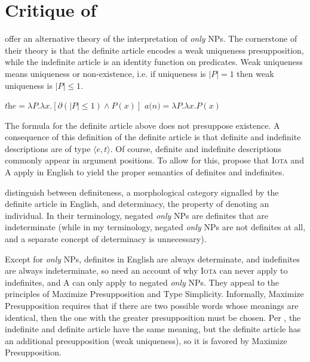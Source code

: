 \section{Critique of \citet{cb2015}\label{sec:coppock-beaver}}
\citet{cb2015} offer an alternative theory of the interpretation of \textit{only} NPs. The cornerstone of their theory is that the definite article encodes a weak uniqueness presupposition, while the indefinite article is an identity function on predicates. Weak uniqueness means uniqueness or non-existence, i.e. if uniqueness is $|P| = 1$ then weak uniqueness is $|P| \le 1$.

\begin{exe}
	\ex $\textit{the} = \lambda P . \lambda x . [\partial(|P| \le 1) \land P(x)]$
	\ex $\textit{a(n)} = \lambda P . \lambda x . P(x)$
\end{exe}

The formula for the definite article above does not presuppose existence. A consequence of this definition of the definite article is that definite and indefinite descriptions are of type $\langle e, t \rangle$. Of course, definite and indefinite descriptions commonly appear in argument positions. To allow for this, \citeauthor{cb2015} propose that \textsc{Iota} and \textsc{A} apply in English to yield the proper semantics of definites and indefinites.

\citeauthor{cb2015} distinguish between definiteness, a morphological category signalled by the definite article in English, and determinacy, the property of denoting an individual. In their terminology, negated \textit{only} NPs are definites that are indeterminate (while in my terminology, negated \textit{only} NPs are not definites at all, and a separate concept of determinacy is unnecessary).

Except for \textit{only} NPs, definites in English are always determinate, and indefinites are always indeterminate, so \citeauthor{cb2015} need an account of why \textsc{Iota} can never apply to indefinites, and \textsc{A} can only apply to negated \textit{only} NPs. They appeal to the principles of Maximize Presupposition and Type Simplicity. Informally, Maximize Presupposition requires that if there are two possible words whose meanings are identical, then the one with the greater presupposition must be chosen. Per \citeauthor{cb2015}, the indefinite and definite article have the same meaning, but the definite article has an additional presupposition (weak uniqueness), so it is favored by Maximize Presupposition.

